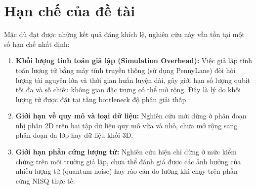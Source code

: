 \section{Hạn chế của đề tài}
Mặc dù đạt được những kết quả đáng khích lệ, nghiên cứu này vẫn tồn tại một số hạn chế nhất định:
\begin{enumerate}
    \item \textbf{Khối lượng tính toán giả lập (Simulation Overhead):} Việc giả lập tính toán lượng tử bằng máy tính truyền thống (sử dụng PennyLane) đòi hỏi lượng tài nguyên lớn và thời gian huấn luyện dài, gây giới hạn số lượng qubit tối đa và số chiều không gian đặc trưng có thể mở rộng. Đây là lý do khối lượng tử được đặt tại tầng bottleneck độ phân giải thấp.
    \item \textbf{Giới hạn về quy mô và loại dữ liệu:} Nghiên cứu mới dừng ở phân đoạn nhị phân 2D trên hai tập dữ liệu quy mô vừa và nhỏ, chưa mở rộng sang phân đoạn đa lớp hay dữ liệu khối 3D.
    \item \textbf{Giới hạn phần cứng lượng tử:} Nghiên cứu hiện chỉ dừng ở mức kiểm chứng trên môi trường giả lập, chưa thể đánh giá được các ảnh hưởng của nhiễu lượng tử (quantum noise) hay rào cản đo lường khi chạy trên phần cứng NISQ thực tế.
\end{enumerate}

